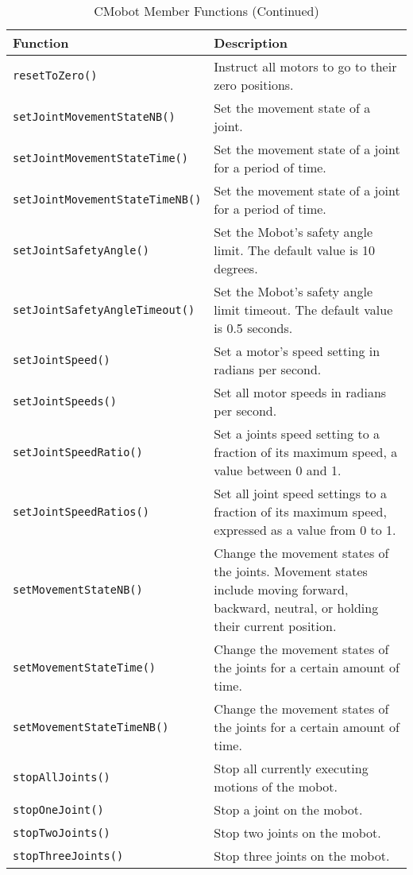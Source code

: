 \begin{table}[!h]
\begin{center}
\caption{CMobot Member Functions (Continued)}
\begin{tabular}{p{48 mm}p{110 mm}}
\hline
Function & Description \\
\hline
\texttt{resetToZero()} & Instruct all motors to go to their zero positions. \\
\texttt{setJointMovementStateNB()} & Set the movement state of a joint. \\
\texttt{setJointMovementStateTime()} & Set the movement state of a joint for a period of time.\\
\texttt{setJointMovementStateTimeNB()} & Set the movement state of a joint for a period of time.\\
\texttt{setJointSafetyAngle()} & Set the Mobot's safety angle limit. The default value is 10 degrees.\\
\texttt{setJointSafetyAngleTimeout()} & Set the Mobot's safety angle limit timeout. The default value is 0.5 seconds.\\
\texttt{setJointSpeed()} & Set a motor's speed setting in radians per second. \\
\texttt{setJointSpeeds()} & Set all motor speeds in radians per second. \\
\texttt{setJointSpeedRatio()} & Set a joints speed setting to a fraction of its maximum speed, a value between 0 and 1. \\
\texttt{setJointSpeedRatios()} & Set all joint speed settings to a fraction of its
maximum speed, expressed as a value from 0 to 1. \\
\texttt{setMovementStateNB()} & Change the movement states of the joints. Movement states include moving forward, backward, neutral, or holding their current position.\\
\texttt{setMovementStateTime()} & Change the movement states of the joints for a certain amount of time.\\
\texttt{setMovementStateTimeNB()} & Change the movement states of the joints for a certain amount of time.\\
\texttt{stopAllJoints()} & Stop all currently executing motions of the mobot. \\
\texttt{stopOneJoint()} & Stop a joint on the mobot. \\
\texttt{stopTwoJoints()} & Stop two joints on the mobot. \\
\texttt{stopThreeJoints()} & Stop three joints on the mobot. \\
\hline
\end{tabular}
\end{center}
\label{mobilec_api_cbinary}
\end{table}


